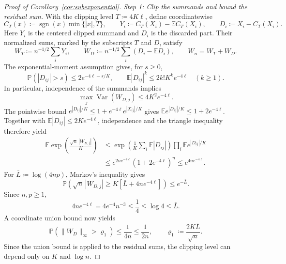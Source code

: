 \documentclass[11pt,letterpaper]{article}
\theoremstyle{remark}
\newcommand{\E}{\mathbb E}
\newcommand{\Pp}{\mathbb P}
\newcommand{\Var}{\operatorname{Var}}
\begin{document}
\begin{proof}[Proof of Corollary~\ref{cor:subexponential}]
\emph{Step 1: Clip the summands and bound the residual sum.}
With the clipping level \(T\coloneqq4K\ell\), define coordinatewise
\[
 C_T(x)\coloneqq \operatorname{sgn}(x)\min\{|x|,T\},\qquad
 Y_i\coloneqq C_T(X_i)-\E C_T(X_i),\qquad D_i\coloneqq X_i-C_T(X_i).
\]
Here \(Y_i\) is the centered clipped summand and \(D_i\) is the discarded
part. Their normalized sums, marked by the subscripts \(T\) and \(D\), satisfy
\[
 W_T\coloneqq n^{-1/2}\sum_iY_i,\qquad
 W_D\coloneqq n^{-1/2}\sum_i(D_i-\E D_i),\qquad W_n=W_T+W_D.
\]
The exponential-moment assumption gives, for \(s\ge0\),
\[
 \Pp(|D_{ij}|>s)\le2e^{-4\ell-s/K},\qquad
 \E|D_{ij}|^k\le2k!K^ke^{-4\ell}\quad(k\ge1).
\]
In particular, independence of the summands implies
\begin{equation}
 \max_j\Var(W_{D,j})\le4K^2e^{-4\ell}.
 \label{tail:residual-moments}
\end{equation}
The pointwise bound \(e^{|D_{ij}|/K}\le1+e^{-4\ell}e^{|X_{ij}|/K}\)
gives \(\E e^{|D_{ij}|/K}\le1+2e^{-4\ell}\). Together with
\(\E|D_{ij}|\le2Ke^{-4\ell}\), independence and the triangle inequality
therefore yield
\begin{align*}
 \E\exp\!\left(\frac{\sqrt n\,|W_{D,j}|}{K}\right)
 &\le\exp\!\left(\frac1K\sum_i\E|D_{ij}|\right)
          \prod_i\E e^{|D_{ij}|/K}\\
 &\le e^{2ne^{-4\ell}}(1+2e^{-4\ell})^n
 \le e^{4ne^{-4\ell}}.
\end{align*}
For \(\bar L\coloneqq \log(4np)\), Markov's inequality gives
\[
 \Pp\!\left(\sqrt n\,|W_{D,j}|\ge K[\bar L+4ne^{-4\ell}]\right)\le e^{-\bar L}.
\]
Since \(n,p\ge1\),
\[
 4ne^{-4\ell}=4e^{-4}n^{-3}\le\frac14\le\log4\le \bar L.
\]
A coordinate union bound now yields
\begin{equation}
 \Pp(\|W_D\|_\infty>\varrho_1)\le\frac1{4n}\le\frac1{2n},\qquad
 \varrho_1\coloneqq \frac{2K\bar L}{\sqrt n}.
 \label{tail:sum-coupling}
\end{equation}
Since the union bound is applied to the residual sums, the clipping
level can depend only on \(K\) and \(\log n\).


\end{proof}
\end{document}
